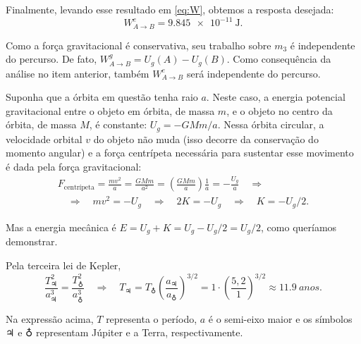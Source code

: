 \documentclass[a4paper]{article}
\newcommand\myrightarrow{\quad\Rightarrow\quad}
\begin{document}
\begin{resolucoes}
\begin{exercicio}
\begin{compactenum}[(a)]
  Finalmente, levando esse resultado em \eqref{eq:W}, obtemos a resposta desejada:
  \begin{equation*}
  W_{A\to B}^{e} = \SI{9.845e-11}{\joule}.
  \end{equation*}
  
  

  \item Como a força gravitacional é conservativa, seu trabalho sobre $m_3$ é independente do percurso.
  De fato, $W_{A\to B}^{g} = U_g(A) - U_g(B)$.
  Como consequência da análise no item anterior, também $W_{A\to B}^{e}$ será independente do percurso.
  \end{compactenum}
  \end{exercicio}

  \begin{exercicio}
   Suponha que a órbita em questão tenha raio $a$.
  Neste caso, a energia potencial gravitacional entre o objeto em órbita, de massa $m$, e o objeto no centro da órbita, de massa $M$, é constante: $U_g = -GMm/a$.  
  Nessa órbita circular, a velocidade orbital $v$ do objeto não muda (isso decorre da conservação do momento angular) e a força centrípeta necessária para sustentar esse movimento é dada pela força gravitacional:
  \begin{gather*}
  F_{\text{centrípeta}} = \frac{mv^2}{a} = \frac{GMm}{a^2} = \left(\frac{GMm}{a}\right)\frac{1}{a} = -\frac{U_g}{a} \myrightarrow\\
  \myrightarrow mv^2= -U_g \myrightarrow 2K = -U_g \myrightarrow K = -U_g/2.
  \end{gather*}
  
  Mas a energia mecânica é $E = U_g + K = U_g - U_g/2 = U_g/2$, como queríamos demonstrar.
  \end{exercicio}
  
  \begin{exercicio}
   Pela terceira lei de Kepler,
  \begin{equation*}
  \frac{T_{\jupiter}^2}{a_{\jupiter}^3} = \frac{T_{\earth}^2}{a_{\earth}^3} \myrightarrow T_{\jupiter} = T_{\earth} \left(\frac{a_{\jupiter}}{a_{\earth}}\right)^{3/2} = 1 \cdot \left(\frac{5,2}{1}\right)^{3/2} \approx \SI{11.9}{anos}.
  \end{equation*}
  
  Na expressão acima, $T$ representa o período, $a$ é o semi-eixo maior e os símbolos $\jupiter$ e $\earth$ representam Júpiter e a Terra, respectivamente.
  \end{exercicio}
  

\end{resolucoes}
\end{document}
